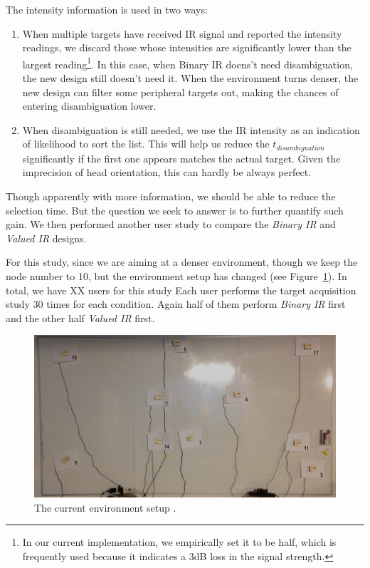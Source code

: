 The intensity information is used in two ways:
\begin{enumerate}
\item When multiple targets have received IR signal and reported the intensity readings, we discard those whose intensities are significantly lower than the largest reading\footnote{In our current implementation, we empirically set it to be half, which is frequently used because it indicates a 3dB loss in the signal strength.}. In this case, when Binary IR doens't need disambiguation, the new design still doesn't need it. When the environment turns denser, the new design can filter some peripheral targets out, making the chances of entering disambiguation lower.
\item When disambiguation is still needed, we use the IR intensity as an indication of likelihood to sort the list. This will help us reduce the $t_{disambiguation}$ significantly if the first one appears matches the actual target. Given the imprecision of head orientation, this can hardly be always perfect.
\end{enumerate}

Though apparently with more information, we should be able to reduce the selection time. But the question we seek to answer is to further quantify such gain. We then performed another user study to compare the {\em Binary IR} and {\em Valued IR} designs.

For this study, since we are aiming at a denser environment, though we keep the node number to 10, but the environment setup has changed (see Figure~\ref{fig:study-layout2}). In total, we have XX users for this study  Each user performs the target acquisition study 30 times for each condition. Again half of them perform {\em Binary IR} first and the other half {\em Valued IR} first.

\begin{figure}[t]
\centering
\includegraphics[width=0.9\columnwidth]{figures/study-layout2.jpg}
\caption{The current environment setup .}
\label{fig:study-layout2}
\end{figure}

